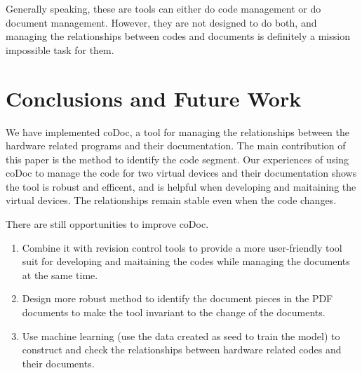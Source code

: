 \documentclass[runningheads,a4paper]{llncs}
\begin{document}
Generally speaking, these are tools can either do code management or do document management.
However, they are not designed to do both,
and managing the relationships between codes and documents is definitely a mission impossible task for them.


\section{Conclusions and Future Work}
\label{sec:conclusion}
We have implemented coDoc, 
a tool for managing the relationships between the hardware related programs and their documentation.
The main contribution of this paper is the method to identify the code segment.
Our experiences of using coDoc to manage the code for two virtual devices and their documentation shows the tool is robust and efficent,
and is helpful when developing and maitaining the virtual devices.
The relationships remain stable even when the code changes.

There are still opportunities to improve coDoc.
\begin{enumerate}
\item Combine it with revision control tools to provide a more user-friendly tool suit for developing and maitaining the codes while managing the documents at the same time.
\item Design more robust method to identify the document pieces in the PDF documents to make the tool invariant to the change of the documents.
\item Use machine learning (use the data created as seed to train the model) to construct and check the relationships between hardware related codes and their documents.
\end{enumerate}




\end{document}
